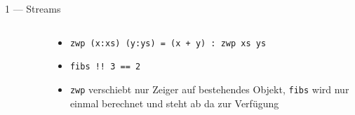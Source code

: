 \documentclass{beamer}
\begin{document}
\begin{frame}{1 --- Streams}
{\begin{columns}
\begin{column}{0.6\textwidth}
\begin{figure}
                \end{figure}
            \end{column}
            \begin{column}{0.4\textwidth}
                \footnotesize
                \begin{itemize}
                    \item \texttt{zwp (x:xs) (y:ys) = (x + y) : zwp xs ys}
                    \item \texttt{fibs !! 3 == 2}
                    \item \texttt{zwp} verschiebt nur Zeiger auf bestehendes Objekt, \texttt{fibs} wird nur einmal berechnet und steht ab da zur Verfügung
                \end{itemize}
            \end{column}
        \end{columns}
    }
\end{frame}


%

%
\end{document}
